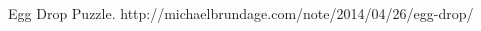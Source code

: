 \documentclass[12pt,a4paper,oneside]{report}
\begin{document}

\renewcommand{\bibname}{References}
\begin{thebibliography}{1} 
	 Egg Drop Puzzle. http://michaelbrundage.com/note/2014/04/26/egg-drop/
\end{thebibliography}

\end{document}
